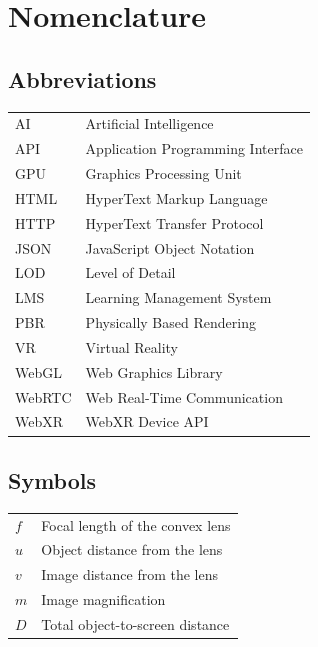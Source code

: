 \chapter*{Nomenclature}

\section*{Abbreviations}

\begin{tabular}{ll}
AI & Artificial Intelligence \\
API & Application Programming Interface \\
GPU & Graphics Processing Unit \\
HTML & HyperText Markup Language \\
HTTP & HyperText Transfer Protocol \\
JSON & JavaScript Object Notation \\
LOD & Level of Detail \\
LMS & Learning Management System \\
PBR & Physically Based Rendering \\
VR & Virtual Reality \\
WebGL & Web Graphics Library \\
WebRTC & Web Real-Time Communication \\
WebXR & WebXR Device API \\
\end{tabular}

\vspace{1cm}

\section*{Symbols}

\begin{tabular}{ll}
$f$ & Focal length of the convex lens \\
$u$ & Object distance from the lens \\
$v$ & Image distance from the lens \\
$m$ & Image magnification \\
$D$ & Total object-to-screen distance \\
\end{tabular}

\vspace{1cm}
